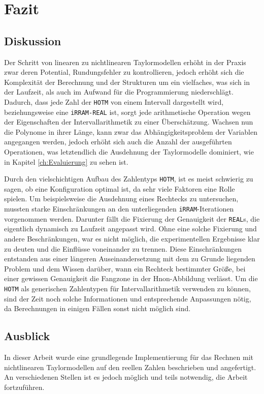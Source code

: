 
\chapter{Fazit}
\label{ch:fazit}

\section{Diskussion}
Der Schritt von linearen zu nichtlinearen Taylormodellen erhöht in der Praxis zwar deren Potential, Rundungsfehler zu kontrollieren, jedoch erhöht sich die Komplexität der Berechnung und der Strukturen um ein vielfaches, was sich in der Laufzeit, als auch im Aufwand für die Programmierung niederschlägt. Dadurch, dass jede Zahl der \verb+HOTM+ von einem Intervall dargestellt wird, beziehungsweise eine \verb+iRRAM-REAL+ ist, sorgt jede arithmetische Operation wegen der Eigenschaften der Intervallarithmetik zu einer Überschätzung. Wachsen nun die Polynome in ihrer Länge, kann zwar das Abhängigkeitsproblem der Variablen angegangen werden, jedoch erhöht sich auch die Anzahl der ausgeführten Operationen, was letztendlich die Ausdehnung der Taylormodelle dominiert, wie in Kapitel \ref{ch:Evaluierung} zu sehen ist. 

Durch den vielschichtigen Aufbau des Zahlentyps \verb+HOTM+, ist es meist schwierig zu sagen, ob eine Konfiguration optimal ist, da sehr viele Faktoren eine Rolle spielen. Um beispielsweise die Ausdehnung eines Rechtecks zu untersuchen, mussten starke Einschränkungen an den unterliegenden \verb+iRRAM+-Iterationen vorgenommen werden. Darunter fällt die Fixierung der Genauigkeit der \verb+REAL+s, die eigentlich dynamisch zu Laufzeit angepasst wird. Ohne eine solche Fixierung und andere Beschränkungen, war es nicht möglich, die experimentellen Ergebnisse klar zu deuten und die Einflüsse voneinander zu trennen. Diese Einschränkungen entstanden aus einer längeren Auseinandersetzung mit dem zu Grunde liegenden Problem und dem Wissen darüber, wann ein Rechteck bestimmter Größe, bei einer gewissen Genauigkeit die Fangzone in der H\e non-Abbildung verlässt. Um die \verb+HOTM+ als generischen Zahlentypen für Intervallarithmetik verwenden zu können, sind der Zeit noch solche Informationen und entsprechende Anpassungen nötig, da Berechnungen in einigen Fällen sonst nicht möglich sind.


\section{Ausblick}
In dieser Arbeit wurde eine grundlegende Implementierung für das Rechnen mit nichtlinearen Taylormodellen auf den reellen Zahlen beschrieben und angefertigt. An verschiedenen Stellen ist es jedoch möglich und teils notwendig, die Arbeit fortzuführen.

